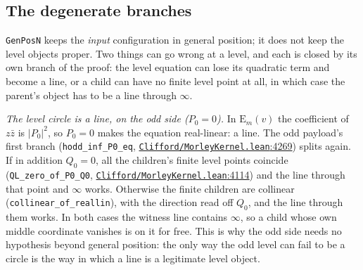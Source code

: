 \documentclass[11pt]{article}
\theoremstyle{definition}
\theoremstyle{remark}
\begin{document}
\hypertarget{the-degenerate-branches}{%
\subsection{The degenerate branches}\label{the-degenerate-branches}}

\texttt{GenPosN} keeps the \emph{input} configuration in general position; it does not keep the level objects
proper. Two things can go wrong at a level, and each is closed by its own branch of the proof: the
level equation can lose its quadratic term and become a line, or a child can have no finite level
point at all, in which case the parent's object has to be a line through $\infty$.

\emph{The level circle is a line, on the odd side (\(P_0 = 0\)).} In \(\mathrm{E}_m(v)\) the coefficient of
\(z\bar z\) is \(|P_0|^2\), so \(P_0 = 0\) makes the equation real-linear: a line. The odd payload's first
branch (\texttt{hodd\_\allowbreak inf\_\allowbreak P0\_\allowbreak eq}, \href{https://github.com/jpbald93/paperl_clifford_chain/blob/e1ae145c2565cc98816635387412edc0a740c27c/Clifford/MorleyKernel.lean\#L4269}{\texttt{Clifford/\allowbreak MorleyKernel.lean}:4269}) splits again. If in addition \(Q_0 = 0\), all
the children's finite level points coincide (\texttt{QL\_\allowbreak zero\_\allowbreak of\_\allowbreak P0\_\allowbreak Q0}, \href{https://github.com/jpbald93/paperl_clifford_chain/blob/e1ae145c2565cc98816635387412edc0a740c27c/Clifford/MorleyKernel.lean\#L4114}{\texttt{Clifford/\allowbreak MorleyKernel.lean}:4114}) and
the line through that point and $\infty$ works. Otherwise the finite children are collinear
(\texttt{collinear\_\allowbreak of\_\allowbreak reallin}), with the direction read off \(Q_0\), and the line through them works. In both
cases the witness line contains $\infty$, so a child whose own middle coordinate vanishes is on it for free.
This is why the odd side needs no hypothesis beyond general position: the only way the odd level can
fail to be a circle is the way in which a line is a legitimate level object.
\end{document}
